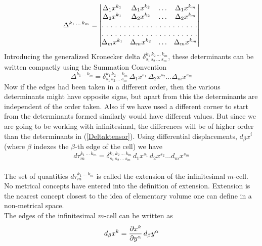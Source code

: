 \begin{equation}
\Delta^{k_1\,...\,k_m}  =  
\begin{vmatrix}
\Delta_1 x^{k_1} & \Delta_1 x^{k_2} & \hdots & \Delta_1 x^{k_m} \\
\Delta_2 x^{k_1} & \Delta_2 x^{k_2} & \hdots & \Delta_2 x^{k_m} \\
\hdotsfor[2]{4}\\
\hdotsfor[2]{4}\\
\Delta_m x^{k_1} & \Delta_m x^{k_2} & \hdots & \Delta_m x^{k_m} \\
\end{vmatrix}\label{detDeltak}
\end{equation}
Introducing the generalized Kronecker delta $\delta^{k_1\,k_2\,...\,k_m}_{s_1\,s_2\,...\,s_m}$, these determinants can be written compactly using the Summation Convention
\begin{equation}
\Delta^{k_1\,...\,k_m}  =  \delta^{k_1\,k_2\,...\,k_m}_{s_1\,s_2\,...\,s_m}\, \Delta_1 x^{s_1}\, \Delta_2 x^{s_2} \hdots \Delta_m x^{s_m}\label{Deltaktensor}
\end{equation}
Now if the edges had been taken in a different order, then the various determinants might have opposite signs, but apart from this the determinants are independent of the order taken. 
Also if we have used a different corner to start from the determinants formed similarly would have different values. But since we are going to be working with infinitesimal, the differences 
will be of higher order than the determinants in (\ref{Deltaktensor}). Using differential displacements, $d_\beta x^i$ (where $\beta$ indexes the $\beta$-th edge of the cell) we have
\begin{equation}
d\tau_m^{k_1\,...\,k_m}  =  \delta^{k_1\,k_2\,...\,k_m}_{s_1\,s_2\,...\,s_m}\, d_1 x^{s_1}\, d_2 x^{s_2} \hdots d_m x^{s_m}\label{tauTensor}
\end{equation}\\
The set of quantities $d\tau_m^{k_1\,...\,k_m}$ is called the {\elevenit extension} of the infinitesimal $m$-cell. No metrical concepts have entered into the definition of extension. Extension is the 
nearest concept closest to the idea of elementary volume one can define in a non-metrical space. \\

The edges of the infinitesimal $m$-cell can be written as
\begin{equation}
d_\beta x^k =  {\partial x^k \over \partial y^\alpha }\,d_\beta y^\alpha
\end{equation}


